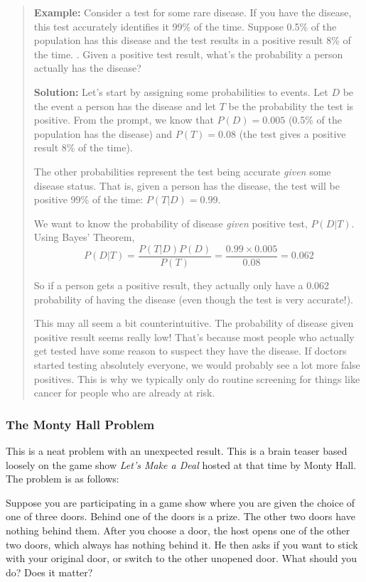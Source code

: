 \documentclass[
]{book}
\begin{document}
\begin{quote}
\textbf{Example:} Consider a test for some rare disease. If you have the disease, this test accurately identifies it 99\% of the time. Suppose 0.5\% of the population has this disease and the test results in a positive result 8\% of the time. . Given a positive test result, what's the probability a person actually has the disease?

\textbf{Solution:} Let's start by assigning some probabilities to events. Let \(D\) be the event a person has the disease and let \(T\) be the probability the test is positive. From the prompt, we know that \(P(D) = 0.005\) (0.5\% of the population has the disease) and \(P(T) = 0.08\) (the test gives a positive result 8\% of the time).

The other probabilities represent the test being accurate \emph{given} some disease status. That is, given a person has the disease, the test will be positive 99\% of the time: \(P(T|D) = 0.99\).

We want to know the probability of disease \emph{given} positive test, \(P(D|T)\). Using Bayes' Theorem, \[P(D|T) = \frac{P(T|D)P(D)}{P(T)} = \frac{0.99\times0.005}{0.08} = 0.062\]

So if a person gets a positive result, they actually only have a 0.062 probability of having the disease (even though the test is very accurate!).

This may all seem a bit counterintuitive. The probability of disease given positive result seems really low! That's because most people who actually get tested have some reason to suspect they have the disease. If doctors started testing absolutely everyone, we would probably see a lot more false positives. This is why we typically only do routine screening for things like cancer for people who are already at risk.
\end{quote}

\subsubsection*{The Monty Hall Problem}\label{the-monty-hall-problem}

This is a neat problem with an unexpected result. This is a brain teaser based loosely on the game show \emph{Let's Make a Deal} hosted at that time by Monty Hall. The problem is as follows:

Suppose you are participating in a game show where you are given the choice of one of three doors. Behind one of the doors is a prize. The other two doors have nothing behind them. After you choose a door, the host opens one of the other two doors, which always has nothing behind it. He then asks if you want to stick with your original door, or switch to the other unopened door. What should you do? Does it matter?
\end{document}
